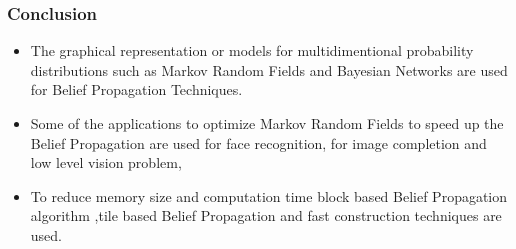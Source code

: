 \documentclass{beamer}
\begin{document}
\begin{frame}
\frametitle{\textbf{Conclusion}}
\begin{itemize}
\item The graphical representation or models for multidimentional probability distributions such as Markov  Random Fields and  Bayesian Networks are used for Belief Propagation Techniques.

\item  Some of the applications to optimize Markov  Random Fields to speed up the  Belief Propagation  are used for face recognition, for image completion and low level vision problem,
\item To reduce memory size and computation time block based Belief Propagation algorithm ,tile based Belief Propagation and fast construction techniques are used.
\end{itemize}
\end{frame}
\end{document}

